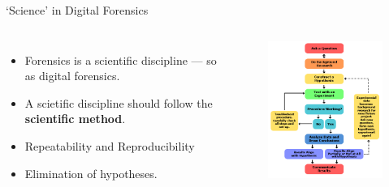 \documentclass[handout]{beamer}
\begin{document}
\begin{frame}{`Science' in Digital Forensics}

\begin{columns}


\begin{itemize}
\footnotesize
\item Forensics is a scientific discipline --- so as digital forensics.
\vspace{10pt}
\item A scietific discipline should follow the \textbf{scientific method}.
\vspace{10pt}
\item Repeatability and Reproducibility
\vspace{10pt}
\item Elimination of hypotheses.
\end{itemize}


\begin{figure}
   \includegraphics[width=160pt]{figures/scientific-method.png}
\end{figure}

\end{columns}

\end{frame}
\end{document}
